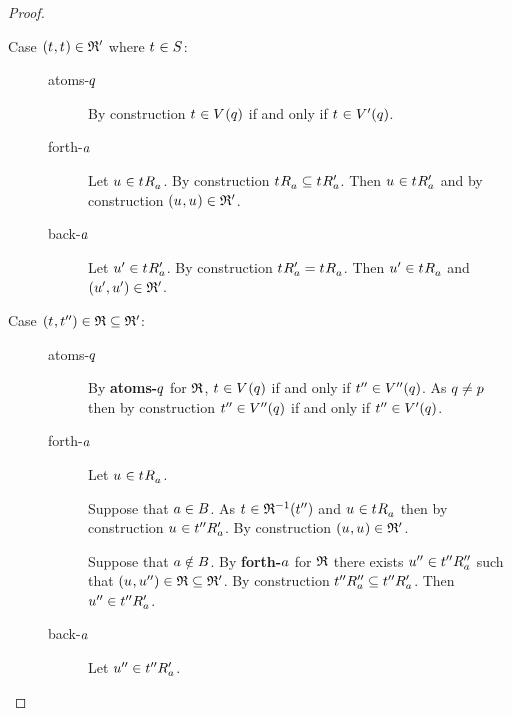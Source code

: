 \begin{proof}
\begin{description}
    \item[Case $(\kStateT, \kStateT) \in \bisimulation'$ where $\kStateT \in \kStates$:]
        \hfill
        \begin{description}
            \item[atoms-$q$] 
                By construction $\kStateT \in \kValuation(\atomQ)$ if and only if $\kStateT \in \kValuationP(\atomQ)$.
            \item[forth-$a$]
                Let $\kStateU \in \kSuccessorsA{\kStateT}$.
                By construction $\kSuccessorsA{\kStateT} \subseteq \kSuccessorsPA{\kStateT}$.
                Then $\kStateU \in \kSuccessorsPA{\kStateT}$ and by construction $(\kStateU, \kStateU) \in \bisimulation'$.
            \item[back-$a$]
                Let $\kStateUP \in \kSuccessorsPA{\kStateT}$.
                By construction $\kSuccessorsPA{\kStateT} = \kSuccessorsA{\kStateT}$.
                Then $\kStateUP \in \kSuccessorsA{\kStateT}$ and $({u}^{\prime}, {u}^{\prime}) \in \mathfrak{R}'$.
        \end{description}
    \item[Case $(\kStateT, \kStateTPP) \in \refinement \subseteq \bisimulation'$:]
        \hfill
        \begin{description}
            \item[atoms-$q$] 
                By {\bf atoms-$q$} for $\mathfrak{R}$, $\kStateT \in \kValuation(\atomQ)$ if and only if ${t}^{\prime\prime} \in {V^{\prime\prime}}(q)$.
                As $q \neq p$ then by construction ${t}^{\prime\prime} \in {V^{\prime\prime}}(q)$ if and only if ${t}^{\prime\prime} \in {V^{\prime}}(q)$.
            \item[forth-$a$]
                Let $\kStateU \in \kSuccessorsA{\kStateT}$.

                Suppose that $a \in B$.
                As $\kStateT \in \refinement^{-1}(\kStateTPP)$ and $\kStateU \in \kSuccessorsA{\kStateT}$ then by construction $\kStateU \in \kSuccessorsPA{\kStateTPP}$.
                By construction $(\kStateU, \kStateU) \in \bisimulation'$.

                Suppose that $a \notin B$.
                By {\bf forth-$a$} for $\mathfrak{R}$ there exists ${u}^{\prime\prime} \in {{t}^{\prime\prime}} {R^{\prime\prime}_{a}}$ such that $(\kStateU, \kStateUPP) \in \refinement \subseteq \bisimulation'$.
                By construction ${{t}^{\prime\prime}} {R^{\prime\prime}_{a}} \subseteq {{t}^{\prime\prime}} {R^{\prime}_{a}}$.
                Then ${u}^{\prime\prime} \in {{t}^{\prime\prime}} {R^{\prime}_{a}}$.
            \item[back-$a$]
                Let ${u}^{\prime\prime} \in {{t}^{\prime\prime}} {R^{\prime}_{a}}$.


\end{description}
\end{description}
\end{proof}
